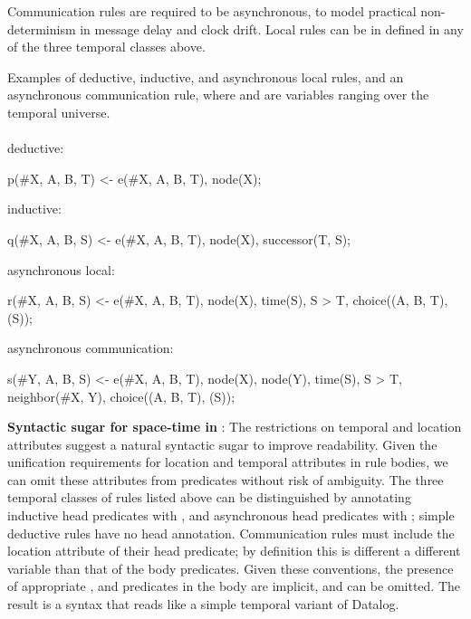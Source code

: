 Communication rules are required to be asynchronous, to model practical non-determinism in message delay and clock drift.  Local rules can be in defined in any of the three temporal classes above.

\begin{example}
\label{ex:nonsugared}
Examples of deductive, inductive, and asynchronous local rules, and an asynchronous communication rule, where  and  are variables ranging over the temporal universe.
\\\\
deductive:\\
\begin{Dedalus}
p(#X, A, B, T) <- e(#X, A, B, T), node(X);
\end{Dedalus}
inductive:\\
\begin{Dedalus}
q(#X, A, B, S) <- e(#X, A, B, T), node(X),
                  successor(T, S);
\end{Dedalus}
asynchronous local:\\
\begin{Dedalus}
r(#X, A, B, S) <- e(#X, A, B, T), node(X), time(S),
                  S > T, choice((A, B, T), (S));
\end{Dedalus}
asynchronous communication:\\
\begin{Dedalus}
s(#Y, A, B, S) <- e(#X, A, B, T), node(X), node(Y),
                  time(S), S > T, neighbor(#X, Y),
                  choice((A, B, T), (S));
\end{Dedalus}
\end{example}

\noindent
\textbf{Syntactic sugar for space-time in \lang}:
The restrictions on temporal and location attributes suggest a natural syntactic sugar to improve readability.  Given the unification requirements for location and temporal attributes in rule bodies, we can omit these attributes from predicates without risk of ambiguity.  
The three temporal classes of rules listed above can be distinguished by annotating inductive head predicates with , and asynchronous head predicates with ; simple deductive rules have no head annotation. 
Communication rules must include the location attribute of their head predicate; by definition this is different a different variable than that of the body predicates.
 Given these conventions, the presence of appropriate ,  and  predicates in the body are implicit, and can be omitted.  The result is a syntax that reads like a simple temporal variant of Datalog.

